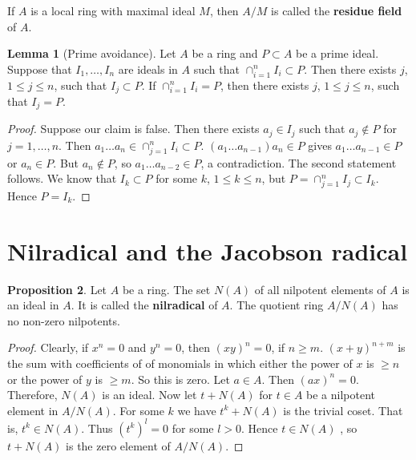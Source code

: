 \documentclass{article}
\newcommand{\rb}[1]{\left( #1 \right)}
\theoremstyle{definition}\newtheorem{definition}{Definition}[section]
\theoremstyle{definition}\newtheorem{remark}[definition]{Remark}
\theoremstyle{definition}\newtheorem*{example}{Example}
\theoremstyle{definition}\newtheorem*{note}{Note}
\newtheorem{proposition}[definition]{Proposition}
\newtheorem{lemma}[definition]{Lemma}
\begin{document}
If $ A $ is a local ring with maximal ideal $ M $, then $ A / M $ is called the \textbf{residue field} of $ A $.

\begin{lemma}[Prime avoidance]
\label{lem:4.12}
Let $ A $ be a ring and $ P \subset A $ be a prime ideal. Suppose that $ I_1, \dots, I_n $ are ideals in $ A $ such that $ \cap_{i = 1}^n I_i \subset P $. Then there exists $ j $, $ 1 \le j \le n $, such that $ I_j \subset P $. If $ \cap_{i = 1}^n I_i = P $, then there exists $ j $, $ 1 \le j \le n $, such that $ I_j = P $.
\end{lemma}

\begin{proof}
Suppose our claim is false. Then there exists $ a_j \in I_j $ such that $ a_j \notin P $ for $ j = 1, \dots, n $. Then $ a_1 \dots a_n \in \cap_{j = 1}^n I_i \subset P $. $ \rb{a_1 \dots a_{n - 1}}a_n \in P $ gives $ a_1 \dots a_{n - 1} \in P $ or $ a_n \in P $. But $ a_n \notin P $, so $ a_1 \dots a_{n - 2} \in P $, a contradiction. The second statement follows. We know that $ I_k \subset P $ for some $ k $, $ 1 \le k \le n $, but $ P = \cap_{j = 1}^n I_j \subset I_k $. Hence $ P = I_k $.
\end{proof}


\section{Nilradical and the Jacobson radical}

\begin{proposition}
Let $ A $ be a ring. The set $ N\rb{A} $ of all nilpotent elements of $ A $ is an ideal in $ A $. It is called the \textbf{nilradical} of $ A $. The quotient ring $ A / N\rb{A} $ has no non-zero nilpotents.
\end{proposition}

\begin{proof}
Clearly, if $ x^n = 0 $ and $ y^n = 0 $, then $ \rb{xy}^n = 0 $, if $ n \ge m $. $ \rb{x + y}^{n + m} $ is the sum with coefficients of of monomials in which either the power of $ x $ is $ \ge n $ or the power of $ y $ is $ \ge m $. So this is zero. Let $ a \in A $. Then $ \rb{ax}^n = 0 $. Therefore, $ N\rb{A} $ is an ideal. Now let $ t + N\rb{A} $ for $ t \in A $ be a nilpotent element in $ A / N\rb{A} $. For some $ k $ we have $ t^k + N\rb{A} $ is the trivial coset. That is, $ t^k \in N\rb{A} $. Thus $ \rb{t^k}^l = 0 $ for some $ l > 0 $. Hence $ t \in N\rb{A} $ , so $ t + N\rb{A} $ is the zero element of $ A / N\rb{A} $.
\end{proof}
\end{document}
